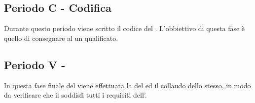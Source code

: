 \documentclass[./PianoDiProgetto.tex]{subfiles}
\begin{document}
  \subsection{Periodo C - Codifica}

  Durante questo periodo viene scritto il codice del . L'obbiettivo
  di questa fase è quello di consegnare al  un  qualificato.

  \subsection{Periodo V - }

  In questa fase finale del  viene effettuata la  del  ed il
  collaudo dello stesso, in modo da verificare che il  soddisfi tutti i requisiti
  dell'\ARdoc. 
\end{document}
